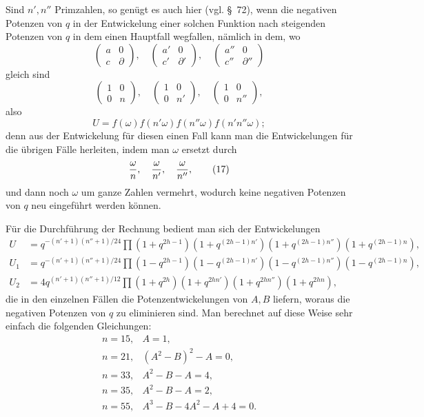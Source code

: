 \documentclass[11pt]{article}
\begin{document}
Sind $n',n''$ Primzahlen, so genügt es auch hier (vgl. \S~72), wenn die negativen Potenzen von $q$ in der Entwickelung einer solchen Funktion nach steigenden Potenzen von $q$ in dem einen Hauptfall wegfallen, nämlich in dem, wo
\[
 \begin{pmatrix}a&0\\ c&\partial\end{pmatrix},
 \quad
 \begin{pmatrix}a'&0\\ c'&\partial'\end{pmatrix},
 \quad
 \begin{pmatrix}a''&0\\ c''&\partial''\end{pmatrix}
\]
gleich sind
\[
 \begin{pmatrix}1&0\\ 0&n\end{pmatrix},
 \quad
 \begin{pmatrix}1&0\\ 0&n'\end{pmatrix},
 \quad
 \begin{pmatrix}1&0\\ 0&n''\end{pmatrix},
\]
also
\[
 U=f(\omega)f(n'\omega)f(n''\omega)f(n'n''\omega);
\]
denn aus der Entwickelung für diesen einen Fall kann man die Entwickelungen für die übrigen Fälle herleiten, indem man $\omega$ ersetzt durch
\begin{equation}
 {\omega\over n},\quad {\omega\over n'},\quad {\omega\over n''},
\tag{17}
\end{equation}
und dann noch $\omega$ um ganze Zahlen vermehrt, wodurch keine negativen Potenzen von $q$ neu eingeführt werden können.

Für die Durchführung der Rechnung bedient man sich der Entwickelungen
\begin{equation}
\begin{aligned}
U&=q^{-(n'+1)(n''+1)/24}\prod(1+q^{2h-1})(1+q^{(2h-1)n'})(1+q^{(2h-1)n''})(1+q^{(2h-1)n}),\\
U_1&=q^{-(n'+1)(n''+1)/24}\prod(1-q^{2h-1})(1-q^{(2h-1)n'})(1-q^{(2h-1)n''})(1-q^{(2h-1)n}),\\
U_2&=4q^{(n'+1)(n''+1)/12}\prod(1+q^{2h})(1+q^{2hn'})(1+q^{2hn''})(1+q^{2hn}),
\end{aligned}
\tag{18}
\end{equation}
die in den einzelnen Fällen die Potenzentwickelungen von $A,B$ liefern, woraus die negativen Potenzen von $q$ zu eliminieren sind. Man berechnet auf diese Weise sehr einfach die folgenden Gleichungen:
\begin{equation}
\begin{array}{rl}
n=15,& A=1,\\
n=21,& (A^2-B)^2-A=0,\\
n=33,& A^2-B-A=4,\\
n=35,& A^2-B-A=2,\\
n=55,& A^3-B-4A^2-A+4=0.
\end{array}
\tag{19}
\end{equation}
\end{document}
